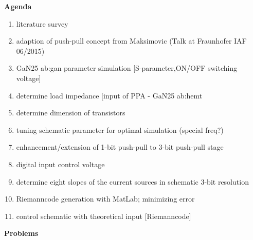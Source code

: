 \textbf{Agenda}
\begin{enumerate}
	\item literature survey
	\item adaption of push-pull concept from Maksimovic (Talk at Fraunhofer IAF 06/2015)
	\item GaN25 \gls{ab:gan} parameter simulation [S-parameter,ON/OFF switching voltage]
	\item determine load impedance [input of PPA - GaN25 \gls{ab:hemt}
	\item determine dimension of transistors
	\item tuning schematic parameter for optimal simulation (special freq?)
	\item enhancement/extension of 1-bit push-pull to 3-bit push-pull stage
	\item digital input control voltage
	\item determine eight slopes of the current sources in schematic 3-bit resolution
	\item Riemanncode generation with MatLab; minimizing error
	\item control schematic with theoretical input [Riemanncode]
\end{enumerate}
\vspace{1cm}
\textbf{Problems}
